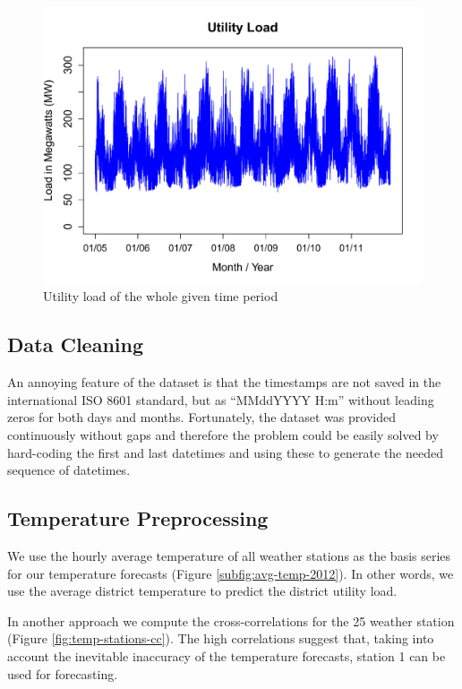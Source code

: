 \documentclass[conference]{IEEEtran}
\begin{document}
\begin{figure}[!ht]
\centering
\includegraphics[width=\linewidth]{gfx/utility-load.pdf}
\caption{Utility load of the whole given time period}
\label{fig:utility-load}
\end{figure}

\subsection{Data Cleaning}
An annoying feature of the dataset is that the timestamps are not saved in the international ISO 8601 standard, but as ``MMddYYYY H:m'' without leading zeros for both days and months. Fortunately, the dataset was provided continuously without gaps and therefore the problem could be easily solved by hard-coding the first and last datetimes and using these to generate the needed sequence of datetimes.

\subsection{Temperature Preprocessing}
\label{sec:temp-proc}
We use the hourly average temperature of all weather stations as the basis series for our temperature forecasts (Figure \ref{subfig:avg-temp-2012}).
In other words, we use the average district temperature to predict the district utility load.\par
In another approach we compute the cross-correlations for the 25 weather station (Figure \ref{fig:temp-stations-cc}). The high correlations suggest that, taking into account the inevitable inaccuracy of the temperature forecasts, station 1 can be used for forecasting.\par
\end{document}
